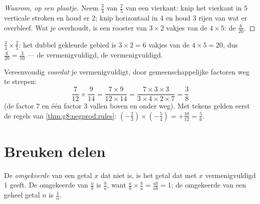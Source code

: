 \begin{proof}[Waarom, op een plaatje]
Neem $\frac34$ van $\frac25$ van een vierkant: knip het vierkant in $5$ verticale
stroken en houd er $2$; knip horizontaal in $4$ en houd $3$ rijen van wat er
overbleef. Wat je overhoudt, is een rooster van $3 \times 2$ vakjes van de
$4 \times 5$: de  $\frac{6}{20}$.
\end{proof}

\begin{omfigure}

{\small $\frac34 \times \frac25$: het dubbel gekleurde gebied is
$3 \times 2 = 6$ vakjes van de $4 \times 5 = 20$, dus
$\frac{6}{20} = \frac{3}{10}$ --- de  vermenigvuldigd, de 
vermenigvuldigd.}
\end{omfigure}

\begin{example}\label{ex:g8:fractions:mult}
Vereenvoudig \emph{voordat} je vermenigvuldigt, door gemeenschappelijke factoren weg
te strepen:
\[
\frac{7}{12} \times \frac{9}{14}
= \frac{7 \times 9}{12 \times 14}
= \frac{7 \times 3 \times 3}{3 \times 4 \times 2 \times 7}
= \frac{3}{8}
\]
(de factor $7$ en één factor $3$ vallen boven en onder weg). Met tekens gelden eerst
de regels van \cref{thm:g8:negprod:rules}:
$\left(-\frac23\right) \times \left(-\frac{5}{4}\right) = +\frac{10}{12} =
\frac56$.
\end{example}

\section{Breuken delen}

\begin{definition}[Omgekeerde]\label{def:g8:fractions:inverse}
De \emph{omgekeerde} van een getal $x$ dat niet  is, is het getal
dat met $x$ vermenigvuldigd $1$ geeft. De omgekeerde van $\frac ab$ is $\frac ba$,
want $\frac ab \times \frac ba = \frac{ab}{ab} = 1$; de omgekeerde van een geheel
getal $n$ is $\frac1n$.
\end{definition}

